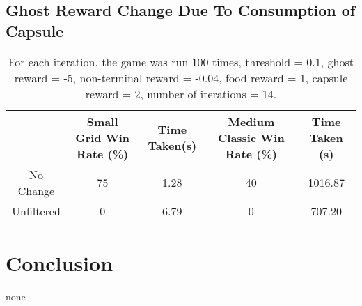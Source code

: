 \documentclass[12pt]{report}
\begin{document}
        \subsection*{Ghost Reward Change Due To Consumption of Capsule}
          \begin{table}[H]
            \begin{center}
              \begin{adjustbox}{max width=\textwidth}
              \begin{tabular}{*{5}{|c}}

                \textbf{} & \textbf{Small Grid Win Rate (\%)} & \textbf{Time Taken(s)} & \textbf{Medium Classic Win Rate (\%)} & \textbf{Time Taken (s)}\\
                \hline
                      No Change & 75 & 1.28 & 40 & 1016.87\\
                      Unfiltered & 0 & 6.79 & 0 & 707.20\\

              \end{tabular}
              \end{adjustbox}
              \caption{For each iteration, the game was run 100 times, threshold = 0.1, ghost reward = -5, non-terminal reward = -0.04, food reward = 1, capsule reward = 2, number of iterations = 14.}
              \label{tab:table4}
            \end{center}
          \end{table}



  \section*{Conclusion}
  none
\end{document}
